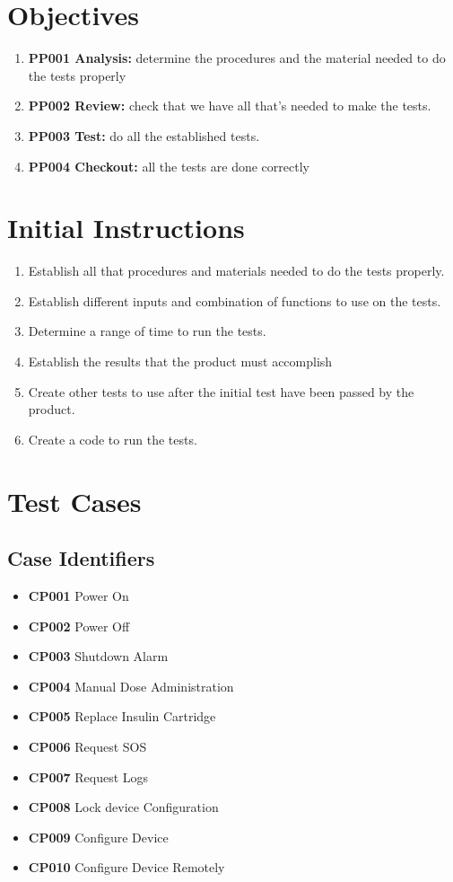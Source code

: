 \documentclass{scrreprt}
\begin{document}
\section{Objectives}
\begin{enumerate}
    \item \textbf{PP001 Analysis:} determine the procedures and the material needed to do the tests properly
    \item \textbf{PP002 Review:} check that we have all that's needed to make the tests.
    \item \textbf{PP003 Test:} do all the established tests.
    \item \textbf{PP004 Checkout:} all the tests are done correctly
\end{enumerate}

\section{Initial Instructions}
\begin{enumerate}
    \item Establish all that procedures and materials needed to do the tests properly.
    \item Establish different inputs and combination of functions to use on the tests.
    \item Determine a range of time to run the tests.
    \item Establish the results that the product must accomplish
    \item Create other tests to use after the initial test have been passed by the product.
    \item Create a code to run the tests.
\end{enumerate}

\section{Test Cases}
\subsection{Case Identifiers}
\begin{itemize}
    \item \textbf{CP001} Power On
    \item \textbf{CP002} Power Off
    \item \textbf{CP003} Shutdown Alarm
    \item \textbf{CP004} Manual Dose Administration
    \item \textbf{CP005} Replace Insulin Cartridge
    \item \textbf{CP006} Request SOS
    \item \textbf{CP007} Request Logs
    \item \textbf{CP008} Lock device Configuration
    \item \textbf{CP009} Configure Device
    \item \textbf{CP010} Configure Device Remotely
\end{itemize}
\end{document}
